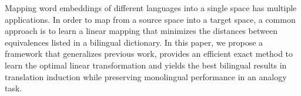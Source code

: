 Mapping word embeddings of different languages into a single space has multiple applications. In order to map from a source space into a target space, a common approach is to learn a linear mapping that minimizes the distances between equivalences listed in a bilingual dictionary. In this paper, we propose a framework that generalizes previous work, provides an efficient exact method to learn the optimal linear transformation and yields the best bilingual results in translation induction while preserving monolingual performance in an analogy task.
